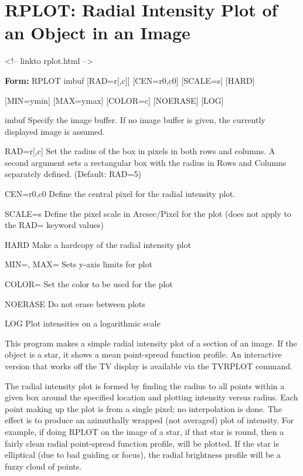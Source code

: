\section{RPLOT: Radial Intensity Plot of an Object in an Image}
\begin{rawhtml}
<!-- linkto rplot.html -->
\end{rawhtml}
\begin{command}
  \item[\textbf{Form: } RPLOT imbuf {[RAD=r{[,c]}]} {[CEN=r0,c0]} 
       {[SCALE=s]} {[HARD]}\hfill]{}
  \item{{[MIN=ymin]} {[MAX=ymax]} {[COLOR=c]} {[NOERASE]} {[LOG]}}
  \item[imbuf]{Specify the image buffer.  If no image buffer
       is given, the currently displayed image is assumed.}
  \item[RAD=r{[,c]}]{ Set the radius of the box in pixels in both rows 
        and columns.  A second argument sets a rectangular 
        box with the radius in Rows and Columns separately 
        defined.  (Default: RAD=5)}
  \item[CEN=r0,c0]{ Define the central pixel for the radial intensity
       plot.}
  \item[SCALE=s]{Define the pixel scale in Arcsec/Pixel for the plot
       (does not apply to the RAD= keyword values)}
  \item[HARD]{Make a hardcopy of the radial intensity plot }
  \item[MIN=, MAX=]{ Sets y-axis limits for plot}
  \item[COLOR=]{ Set the color to be used for the plot}
  \item[NOERASE]{ Do not erase between plots}
  \item[LOG]{ Plot intensities on a logarithmic scale}
\end{command}

This program makes a simple radial intensity plot of a section of an image.
If the object is a star, it shows a mean point-spread function profile.  An
interactive version that works off the TV display is available via the
TVRPLOT command.

The radial intensity plot is formed by finding the radius to all points
within a given box around the specified location and plotting intensity
versus radius.  Each point making up the plot is from a single pixel; no
interpolation is done.  The effect is to produce an azimuthally wrapped
(not averaged) plot of intensity.  For example, if doing RPLOT on the image
of a star, if that star is round, then a fairly clean radial point-spread
function profile, will be plotted.  If the star is elliptical (due to bad
guiding or focus), the radial brightness profile will be a fuzzy cloud of
points.


